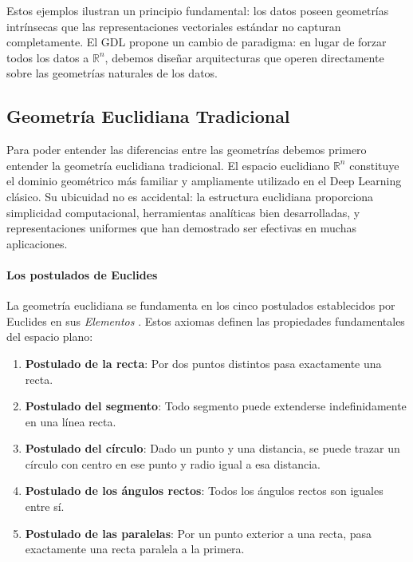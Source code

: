 Estos ejemplos ilustran un principio fundamental: los datos poseen geometrías intrínsecas que las representaciones vectoriales estándar no capturan completamente. El \gls{GDL} propone un cambio de paradigma: en lugar de forzar todos los datos a $\mathbb{R}^n$, debemos diseñar arquitecturas que operen directamente sobre las geometrías naturales de los datos.

\subsection{Geometría Euclidiana Tradicional}\label{subsec:geometria_euclidiana}

Para poder entender las diferencias entre las geometrías debemos primero entender la geometría euclidiana tradicional. El espacio euclidiano $\mathbb{R}^n$ constituye el dominio geométrico más familiar y ampliamente utilizado en el Deep Learning clásico. Su ubicuidad no es accidental: la estructura euclidiana proporciona simplicidad computacional, herramientas analíticas bien desarrolladas, y representaciones uniformes que han demostrado ser efectivas en muchas aplicaciones.

\paragraph{Los postulados de Euclides}

La geometría euclidiana se fundamenta en los cinco postulados establecidos por Euclides en sus \textit{Elementos} \citep{euclid1956elements}. Estos axiomas definen las propiedades fundamentales del espacio plano:

\begin{enumerate}
    \item \textbf{Postulado de la recta}: Por dos puntos distintos pasa exactamente una recta.
    \item \textbf{Postulado del segmento}: Todo segmento puede extenderse indefinidamente en una línea recta.
    \item \textbf{Postulado del círculo}: Dado un punto y una distancia, se puede trazar un círculo con centro en ese punto y radio igual a esa distancia.
    \item \textbf{Postulado de los ángulos rectos}: Todos los ángulos rectos son iguales entre sí.
    \item \textbf{Postulado de las paralelas}: Por un punto exterior a una recta, pasa exactamente una recta paralela a la primera.
\end{enumerate}

